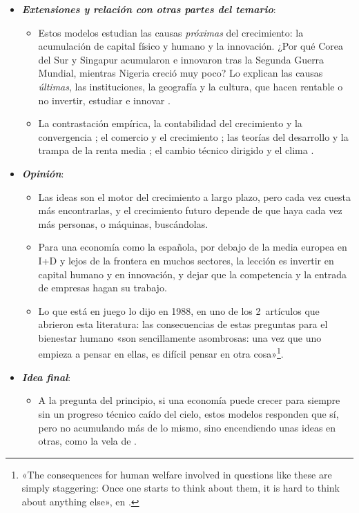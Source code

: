 \documentclass[11pt]{article}
\begin{document}
\begin{itemize}
\begin{itemize}
  \item Y explican por qué una recesión puede tener efectos permanentes sobre el nivel de la renta.
  \end{itemize}
\item \textbf{\emph{Extensiones y relación con otras partes del temario}}:
  \begin{itemize}
  \item Estos modelos estudian las causas \emph{próximas} del crecimiento: la acumulación de capital físico y humano y la innovación. ¿Por qué Corea del Sur y Singapur acumularon e innovaron tras la Segunda Guerra Mundial, mientras Nigeria creció muy poco? Lo explican las causas \emph{últimas}, las instituciones, la geografía y la cultura, que hacen rentable o no invertir, estudiar e innovar\nocite{Acemoglu2009}\nocite{AcemogluJohnsonRobinson2001Colonial} .
  \item La contrastación empírica, la contabilidad del crecimiento y la convergencia ; el comercio y el crecimiento ; las teorías del desarrollo y la trampa de la renta media ; el cambio técnico dirigido y el clima .
  \end{itemize}
\item \textbf{\emph{Opinión}}:
  \begin{itemize}
  \item Las ideas son el motor del crecimiento a largo plazo, pero cada vez cuesta más encontrarlas, y el crecimiento futuro depende de que haya cada vez más personas, o máquinas, buscándolas.

  \item Para una economía como la española, por debajo de la media europea en I+D y lejos de la frontera en muchos sectores, la lección es invertir en capital humano y en innovación, y dejar que la competencia y la entrada de empresas hagan su trabajo.

  \item Lo que está en juego lo dijo  en 1988, en uno de los 2~artículos que abrieron esta literatura: las consecuencias de estas preguntas para el bienestar humano «son sencillamente asombrosas: una vez que uno empieza a pensar en ellas, es difícil pensar en otra cosa»\footnote{«The consequences for human welfare involved in questions like these are simply staggering: Once one starts to think about them, it is hard to think about anything else», en \textcite[pág.~5]{Lucas1988}.}.
  \end{itemize}
\item \textbf{\emph{Idea final}}:
  \begin{itemize}
  \item A la pregunta del principio, si una economía puede crecer para siempre sin un progreso técnico caído del cielo, estos modelos responden que sí, pero no acumulando más de lo mismo, sino encendiendo unas ideas en otras, como la vela de .


\end{itemize}
\end{itemize}
\end{document}
